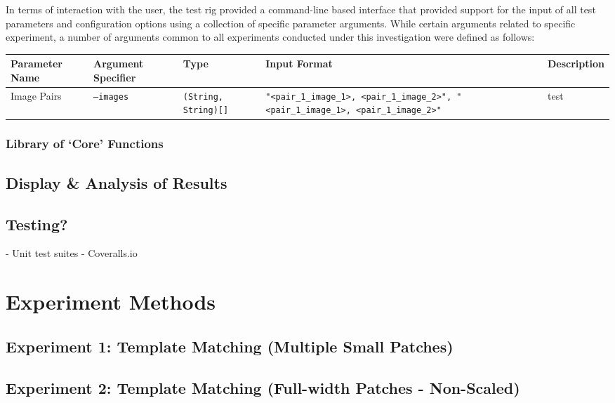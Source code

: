 
In terms of interaction with the user, the test rig provided a command-line based interface that provided support for the input of all test parameters and configuration options using a collection of specific parameter arguments. While certain arguments related to specific experiment, a number of arguments common to all experiments conducted under this investigation were defined as follows:

\begin{table}[h]
\small
\begin{tabular}{|p{2cm}|p{2cm}|p{2cm}|p{4cm}|p{3cm}|}
\hline
Parameter Name & Argument Specifier & Type  & Input Format & Description \\ \hline
Image Pairs & \texttt{--images} & \texttt{(String, String)[]} & \texttt{"\textless pair\_1\_image\_1\textgreater, \textless pair\_1\_image\_2\textgreater", "\textless pair\_1\_image\_1\textgreater, \textless pair\_1\_image\_2\textgreater"} & test \\
\hline   
\end{tabular}
\end{table}



\subsubsection{Library of `Core' Functions}

\subsection{Display \& Analysis of Results}

\subsection{Testing?}

- Unit test suites
- Coveralls.io

\section{Experiment Methods}

\subsection{Experiment 1: Template Matching (Multiple Small Patches)}
\label{ex1}
\subsection{Experiment 2: Template Matching (Full-width Patches - Non-Scaled)}
